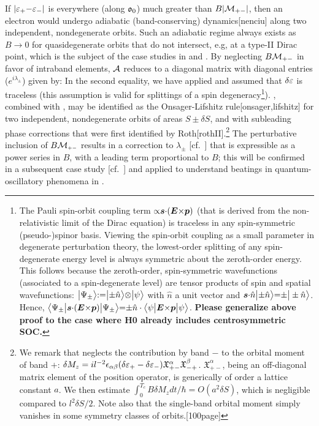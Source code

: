 \documentclass[aps, prb, showpacs, twocolumn, notitlepage, superscriptaddress]{revtex4-1}
\begin{document}
 If $|\varepsilon_+{-}\varepsilon_-|$ is everywhere (along $\mathfrak{o}_0$) much greater than $B|{\cal M}_{+-}|$, then an electron would undergo adiabatic (band-conserving) dynamics[nenciu] along two independent, nondegenerate orbits. Such an adiabatic regime always exists as $B{\rightarrow} 0$ for quasidegenerate orbits that do not intersect, e.g, at a type-II Dirac point, which is the subject of the case studies in  and .
By  neglecting  $B{\cal M}_{+-}$ in favor of intraband elements,  ${\cal A}$ reduces to a diagonal matrix with  diagonal entries ($e^{i\lambda_{\pm}}$) given by:
In the second equality, we have applied  and assumed that 
 $\delta \varepsilon$ is traceless (this assumption is  valid for splittings of a spin degeneracy\footnote{The Pauli spin-orbit coupling term ${\propto} \boldsymbol{s}{\cdot} (\boldsymbol{E} {\times} \boldsymbol{p})$ (that is derived from the non-relativistic limit of the Dirac equation) is traceless in any spin-symmetric (pseudo-)spinor basis.  Viewing the spin-orbit coupling as a small parameter in degenerate perturbation theory, the lowest-order splitting of any spin-degenerate energy level is always symmetric about the zeroth-order energy. This follows because the zeroth-order, spin-symmetric wavefunctions (associated to a spin-degenerate level) are tensor products of spin and spatial wavefunctions: $\big|\Psi_{\pm}\big\rangle{:}{=}\big|{\pm}\hat{n}\big\rangle{\otimes} \big|\psi\big\rangle$ with $\hat{n}$ a unit vector and  $\boldsymbol{s}{\cdot} \hat{n} \big|{\pm}\hat{n}\big\rangle{=}{\pm}\big|\pm \hat{n}\big\rangle$. Hence, $\big\langle \Psi_{\pm} \big| \boldsymbol{s}{\cdot} (\boldsymbol{E} {\times} \boldsymbol{p}) \big| \Psi_{\pm} \big\rangle{=}{\pm}\hat{n}\cdot\big\langle \psi \big| \boldsymbol{E} {\times} \boldsymbol{p} \big| \psi \big\rangle$. \textbf{Please generalize above proof to the case where H0 already includes centrosymmetric SOC. }}).  , combined with , may be identified as the Onsager-Lifshitz rule[onsager,lifshitz] for  two independent, nondegenerate orbits of areas $S{\pm}\delta S$, and with subleading phase corrections that were first identified by Roth[rothII].\footnote{We remark that  neglects the contribution by band $-$ to the orbital moment of band $+$: $\delta M_z=il^{-2}\epsilon_{\alpha\beta}(\delta \varepsilon_+-\delta \varepsilon_-)\mathfrak{X}^{\alpha}_{+-}\mathfrak{X}^{\beta}_{-+}$. $\mathfrak{X}^{\alpha}_{+-}$, being an off-diagonal matrix element of the position operator, is generically of order a lattice constant $a$. We then estimate $\int_0^{T_c} B\delta M_z dt/\hbar=O(a^2 \delta S )$, which is negligible compared to $l^2\delta S/2$. Note also that the single-band orbital moment simply vanishes in some symmetry classes of orbits.[100page] } The perturbative inclusion of $B{\cal M}_{\scriptscriptstyle{+-}}$ results in  a correction to $\lambda_{\pm}$ [cf.\ ] that is expressible as a power series in $B$, with a leading term proportional to $B$; this will be confirmed in a subsequent case study [cf.\ ] and applied to understand beatings in quantum-oscillatory phenomena in  .    \\
\end{document}
